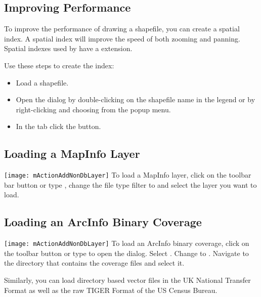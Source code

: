 \subsection{Improving Performance}

To improve the performance of drawing a shapefile, you can create a spatial
index. A  spatial index will improve the
speed of both zooming and panning. Spatial indexes used by \qg have a
 extension.

Use these steps to create the index:

\begin{itemize}[label=--]
\item Load a shapefile.
\item Open the  dialog by double-clicking on the
shapefile name in the legend or by right-clicking and choosing
 from the popup menu.
\item In the tab  click the  button.
\end{itemize}

\subsection{Loading a MapInfo Layer}

\texttt{[image: mActionAddNonDbLayer]} To load a MapInfo layer, click on the  toolbar bar button or type , change the
file type filter to  and select the layer you want to load.

\subsection{Loading an ArcInfo Binary Coverage}

\texttt{[image: mActionAddNonDbLayer]} To load an ArcInfo binary coverage, click on the
 toolbar button or type
 to open the  dialog. Select
. Change to .
Navigate to the directory that contains the coverage files and select it.

Similarly, you can load directory based  vector files in the UK National Transfer Format as well as the
raw TIGER Format of the US Census Bureau.

